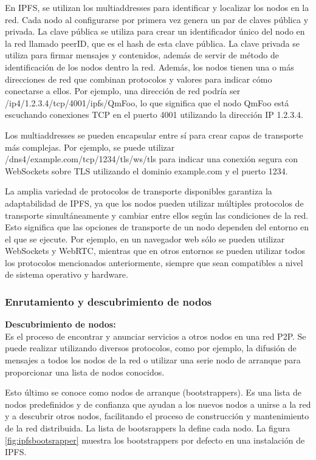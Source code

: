 En IPFS, se utilizan los multiaddresses para identificar y localizar los nodos en la red. Cada nodo al configurarse por primera vez
genera un par de claves pública y privada. La clave pública se utiliza para crear un identificador único del nodo en la red llamado peerID, que es el hash de esta clave pública. La clave privada se utiliza para firmar mensajes y contenidos, además de servir de método de identificación de los nodos dentro la red. Además, los nodos tienen una o más direcciones de red que combinan protocolos y valores para indicar cómo conectarse a ellos. Por ejemplo, una dirección de red podría ser /ip4/1.2.3.4/tcp/4001/ipfs/QmFoo, lo que significa que el nodo QmFoo está escuchando conexiones TCP en el puerto 4001 utilizando la dirección IP 1.2.3.4.

Los multiaddresses se pueden encapsular entre sí para crear capas de transporte más complejas. Por ejemplo, se puede utilizar /dns4/example.com/tcp/1234/tls/ws/tls para indicar una conexión segura con WebSockets sobre TLS utilizando el dominio example.com y el puerto 1234.

La amplia variedad de protocolos de transporte disponibles garantiza la adaptabilidad de IPFS, ya que los nodos pueden utilizar múltiples protocolos de transporte simultáneamente y cambiar entre ellos según las condiciones de la red. Esto significa que las opciones de transporte de un nodo dependen del entorno en el que se ejecute. Por ejemplo, en un navegador web sólo se pueden utilizar WebSockets y WebRTC, mientras que en otros entornos se pueden utilizar todos los protocolos mencionados anteriormente, siempre que sean compatibles a nivel de sistema operativo y hardware.

\subsubsection{Enrutamiento y descubrimiento de nodos}
\textbf{Descubrimiento de nodos:}
\\Es el proceso de encontrar y anunciar servicios a otros nodos en una red P2P. Se puede realizar utilizando diversos protocolos,
como por ejemplo, la difusión de mensajes a todos los nodos de la red o utilizar una serie nodo de arranque para proporcionar una lista de nodos conocidos.

Esto último se conoce como nodos de arranque (bootstrappers). Es una lista de nodos predefinidos  y de confianza que ayudan a los nuevos nodos a unirse a la red y a descubrir otros nodos, facilitando el proceso de construcción y mantenimiento de la red distribuida. La lista de bootsrappers la define cada nodo. La figura \ref{fig:ipfsbootsrapper} muestra los bootstrappers por defecto en una instalación de IPFS.

